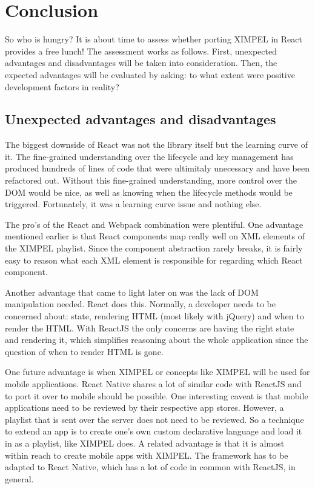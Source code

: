 \section{Conclusion}
So who is hungry? It is about time to assess whether porting XIMPEL in React provides a free lunch! The assessment works as follows. First, unexpected advantages and disadvantages will be taken into consideration. Then, the expected advantages will be evaluated by asking: to what extent were positive development factors in reality?

\subsection{Unexpected advantages and disadvantages}
The biggest downside of React was not the library itself but the learning curve of it. The fine-grained understanding over the lifecycle and key management has produced hundreds of lines of code that were ultimitaly unecessary and have been refactored out. Without this fine-grained understanding, more control over the DOM would be nice, as well as knowing when the lifecycle methods would be triggered. Fortunately, it was a learning curve issue and nothing else. 

The pro's of the React and Webpack combination were plentiful. One advantage mentioned earlier is that React components map really well on XML elements of the XIMPEL playlist. Since the component abstraction rarely breaks, it is fairly easy to reason what each XML element is responsible for regarding which React component. 

Another advantage that came to light later on was the lack of DOM manipulation needed. React does this. Normally, a developer needs to be concerned about: state, rendering HTML (most likely with jQuery) and when to render the HTML. With ReactJS the only concerns are having the right state and rendering it, which simplifies reasoning about the whole application since the question of when to render HTML is gone.

One future advantage is when XIMPEL or concepts like XIMPEL will be used for mobile applications. React Native shares a lot of similar code with ReactJS and to port it over to mobile should be possible. One interesting caveat is that mobile applications need to be reviewed by their respective app stores. However, a playlist that is sent over the server does not need to be reviewed. So a technique to extend an app is to create one's own custom declarative language and load it in as a playlist, like XIMPEL does. A related advantage is that it is almost within reach to create mobile apps with XIMPEL. The framework has to be adapted to React Native, which has a lot of code in common with ReactJS, in general.

